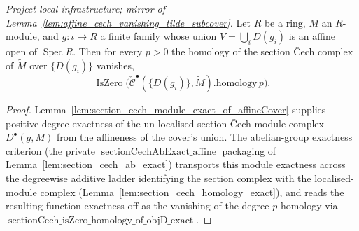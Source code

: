 \begin{lemma}
  \label{lem:sectionCech_homology_exact_of_affineCover}
  \textit{Project-local infrastructure; mirror of
  Lemma~\ref{lem:affine_cech_vanishing_tilde_subcover}.}
  Let \(R\) be a ring, \(M\) an \(R\)-module, and \(g : \iota \to R\) a finite family whose union
  \(V = \bigcup_i D(g_i)\) is an affine open of \(\operatorname{Spec} R\). Then for every \(p > 0\) the
  homology of the section {\v C}ech complex of \(\widetilde{M}\) over \(\{D(g_i)\}\) vanishes,
  \[
    \operatorname{IsZero}\bigl(\check{\mathcal{C}}^\bullet(\{D(g_i)\}, \widetilde{M}).\mathrm{homology}\, p\bigr).
  \]
\end{lemma}
\begin{proof}
  \leanok
  Lemma~\ref{lem:section_cech_module_exact_of_affineCover} supplies positive-degree exactness of the
  un-localised section {\v C}ech module complex \(D^\bullet(g, M)\) from the affineness of the cover's
  union. The abelian-group exactness criterion (the private \(\operatorname{sectionCechAbExact\_affine}\)
  packaging of Lemma~\ref{lem:section_cech_ab_exact}) transports this module exactness across the
  degreewise additive ladder identifying the section complex with the localised-module complex
  (Lemma~\ref{lem:section_cech_homology_exact}), and reads the resulting function exactness off as the
  vanishing of the degree-\(p\) homology via
  \(\operatorname{sectionCech\_isZero\_homology\_of\_objD\_exact}\).
\end{proof}

